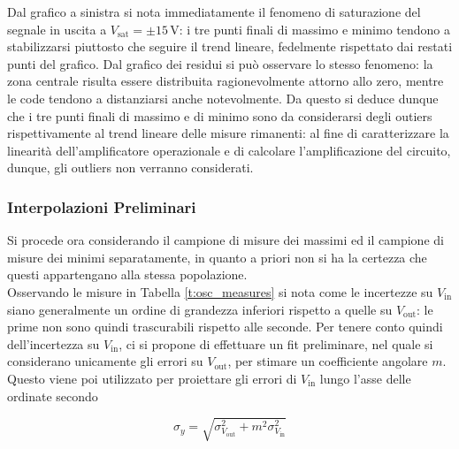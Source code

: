 \documentclass[a4paper,11pt]{article} %
\begin{document}
\noindent Dal grafico a sinistra si nota immediatamente il fenomeno di saturazione del segnale in uscita a
$V_{\text{sat}}=\pm15\,\si{\volt}$: i tre punti finali di massimo e minimo tendono a stabilizzarsi piuttosto che seguire
il trend lineare, fedelmente rispettato dai restati punti del grafico. Dal grafico dei residui si può osservare lo
stesso fenomeno: la zona centrale risulta essere distribuita ragionevolmente attorno allo zero, mentre le code tendono a
distanziarsi anche notevolmente. Da questo si deduce dunque che i tre punti finali di massimo e di minimo sono da
considerarsi degli outiers rispettivamente al trend lineare delle misure rimanenti: al fine di caratterizzare la
linearità dell'amplificatore operazionale e di calcolare l'amplificazione del circuito, dunque, gli outliers non
verranno considerati.


\subsubsection{Interpolazioni Preliminari}
Si procede ora considerando il campione di misure dei massimi ed il campione di misure dei minimi separatamente, in
quanto a priori non si ha la certezza che questi appartengano alla stessa popolazione. \\
Osservando le misure in Tabella \ref{t:osc_measures} si nota come le incertezze su $V_{\text{in}}$ siano generalmente un
ordine di grandezza inferiori rispetto a quelle su $V_{\text{out}}$: le prime non sono quindi trascurabili rispetto alle
seconde. Per tenere conto quindi dell'incertezza su $V_{\text{in}}$, ci si propone di effettuare un fit
preliminare, nel quale si considerano unicamente gli errori su $V_{\text{out}}$, per stimare un coefficiente angolare
$m$. Questo viene poi utilizzato per proiettare gli errori di $V_{\text{in}}$ lungo l'asse delle ordinate secondo 

\begin{equation}\label{e:proj}
	\sigma_{y} = \sqrt{	\sigma_{V_{\text{out}}}^2	+	m^2	\sigma_{V_{\text{in}}}^2	}
\end{equation}

%
\end{document}
